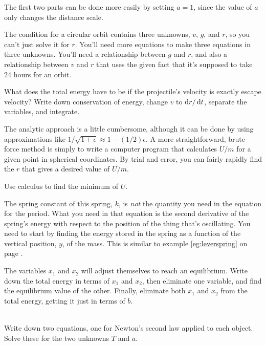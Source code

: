 \label{hwhint:lennardjones} The first two parts can be done more easily by
setting $a=1$, since the value of $a$ only changes the distance
scale.

\label{hwhint:geosynch} The condition for a circular orbit
contains three unknowns, $v$, $g$, and $r$, so you can't just solve it for $r$. You'll need
more equations to make three equations in three unknowns. You'll need a relationship
between $g$ and $r$, and also a relationship between $v$ and $r$ that uses the
given fact that it's supposed to take 24 hours for an orbit.

\label{hwhint:escape2} What does the total energy have to
be if the projectile's velocity is exactly escape velocity? Write down conservation
of energy, change $v$ to $\operatorname{d\!}{}r/\operatorname{d\!}{}t$, separate the variables, and integrate.

\label{hwhint:tides} The analytic approach is a little cumbersome,
although it can be done  by using approximations like
$1/\sqrt{1+\epsilon}\approx1-(1/2)\epsilon$. A more straightforward, brute-force
method is simply to write a computer program that calculates $U/m$ for
a given point in spherical coordinates. By trial and error, you can fairly rapidly
find the $r$ that gives a desired value of $U/m$.

\label{hwhint:hangfromspring}
Use calculus to find the minimum of $U$.

\label{hwhint:pulleyandspring}
The spring constant of this spring, $k$, is \emph{not} the quantity
you need in the equation for the period. What you need in that equation
is the second derivative of the spring's energy with respect to the
position of the thing that's oscillating. You need to 
start by finding the energy stored in the spring as a function of
the vertical position, $y$, of the mass. This is similar to
example \ref{eg:leverspring} on page \pageref{eg:leverspring}.

\label{hwhint:springsseries} The variables
$x_1$ and $x_2$ will adjust themselves to reach an equilibrium. Write down the total
energy in terms of $x_1$ and $x_2$, then eliminate one variable, and find the
equilibrium value of the other. Finally, eliminate both $x_1$ and $x_2$ from the
total energy, getting it just in terms of $b$.


\noindent{}\\
\label{hwhint:tugboat} Write down two equations, one for Newton's
	second law applied to each object. Solve these for the two
	unknowns $T$ and $a$.
	
